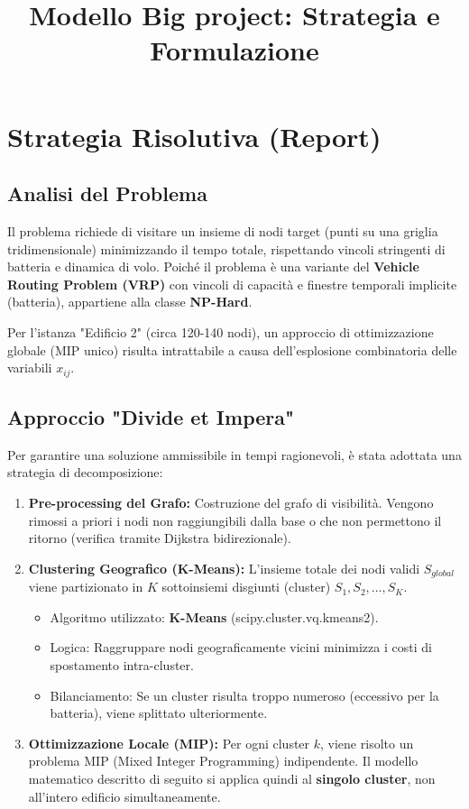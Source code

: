 \documentclass{article}
\title{Modello Big project: Strategia e Formulazione}
\begin{document}
\maketitle

\section{Strategia Risolutiva (Report)}

\subsection{Analisi del Problema}
Il problema richiede di visitare un insieme di nodi target (punti su una griglia tridimensionale) minimizzando il tempo totale, rispettando vincoli stringenti di batteria e dinamica di volo.
Poiché il problema è una variante del \textbf{Vehicle Routing Problem (VRP)} con vincoli di capacità e finestre temporali implicite (batteria), appartiene alla classe \textbf{NP-Hard}. 

Per l'istanza "Edificio 2" (circa 120-140 nodi), un approccio di ottimizzazione globale (MIP unico) risulta intrattabile a causa dell'esplosione combinatoria delle variabili $x_{ij}$.

\subsection{Approccio "Divide et Impera"}
Per garantire una soluzione ammissibile in tempi ragionevoli, è stata adottata una strategia di decomposizione:

\begin{enumerate}
    \item \textbf{Pre-processing del Grafo:}
    Costruzione del grafo di visibilità. Vengono rimossi a priori i nodi non raggiungibili dalla base o che non permettono il ritorno (verifica tramite Dijkstra bidirezionale).
    
    \item \textbf{Clustering Geografico (K-Means):}
    L'insieme totale dei nodi validi $S_{global}$ viene partizionato in $K$ sottoinsiemi disgiunti (cluster) $S_1, S_2, \dots, S_K$. 
    \begin{itemize}
        \item Algoritmo utilizzato: \textbf{K-Means} (scipy.cluster.vq.kmeans2).
        \item Logica: Raggruppare nodi geograficamente vicini minimizza i costi di spostamento intra-cluster.
        \item Bilanciamento: Se un cluster risulta troppo numeroso (eccessivo per la batteria), viene splittato ulteriormente.
    \end{itemize}

    \item \textbf{Ottimizzazione Locale (MIP):}
    Per ogni cluster $k$, viene risolto un problema MIP (Mixed Integer Programming) indipendente. Il modello matematico descritto di seguito si applica quindi al \textbf{singolo cluster}, non all'intero edificio simultaneamente.
\end{enumerate}
\end{document}
